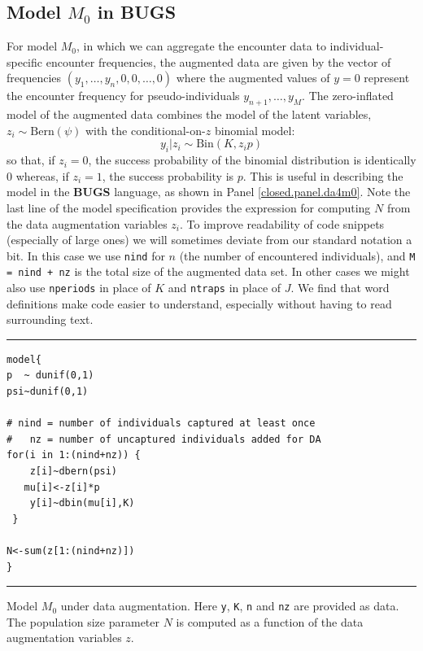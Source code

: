 \subsection{Model $M_0$ in BUGS}

For model $M_0$, in which we can aggregate the encounter data to
individual-specific encounter frequencies, the augmented data are
given by the vector of frequencies $(y_{1}, \ldots, y_{n}, 0, 0,
\ldots, 0)$ where the augmented values of $y=0$ represent the encounter
frequency  for pseudo-individuals $y_{n+1},\ldots,y_{M}$.
The zero-inflated model of the augmented data combines
the model of the latent variables, $z_{i} \sim \mbox{Bern}(\psi)$ with
the conditional-on-$z$ binomial model:
\[
y_{i}|z_{i}   \sim \mbox{Bin}(K,z_{i} p)
\]
so that, if $z_{i}=0$, the success probability of the binomial
distribution is identically 0 whereas, if $z_{i}=1$, the success
probability is $p$. This is useful in describing the model in the {\bf
  BUGS} language, as shown in Panel \ref{closed.panel.da4m0}.
 Note the last line of the model
specification  provides the expression for computing $N$ from the
data augmentation variables $z_{i}$. To improve readability of code
snippets (especially of large ones) we will sometimes deviate from our
standard notation a bit. In this case we use \mbox{\tt nind} for $n$
(the number of encountered individuals), and \mbox{\tt M = nind + nz}
is the total size of the augmented data set. In other cases we might
also use \mbox{\tt nperiods} in place of $K$ and \mbox{\tt ntraps} in
place of $J$. We find that word definitions make code easier to
understand, especially without having to read surrounding text.

\begin{panel}[htp]
\centering
\rule[0.15in]{\textwidth}{.03in}
{\small
\begin{verbatim}
model{
p  ~ dunif(0,1)
psi~dunif(0,1)

# nind = number of individuals captured at least once
#   nz = number of uncaptured individuals added for DA
for(i in 1:(nind+nz)) {
    z[i]~dbern(psi)
   mu[i]<-z[i]*p
    y[i]~dbin(mu[i],K)
 }

N<-sum(z[1:(nind+nz)])
}
\end{verbatim}
}
\rule[-0.15in]{\textwidth}{.03in}
\caption{Model $M_{0}$ under data augmentation. Here \mbox{\tt y},
  \mbox{\tt K}, \mbox{\tt n} and \mbox{\tt nz} are provided as
  data. The population size parameter $N$ is computed as a function of
the data augmentation variables $z$. }
\label{closed.panel.da4m0}
\end{panel}

